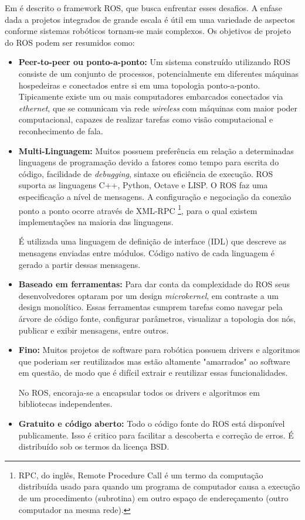 Em \citep{quigley2009ros} é descrito o framework ROS, que busca enfrentar esses desafios. A enfase dada a projetos integrados de grande escala é útil em uma variedade de aspectos conforme sistemas robóticos tornam-se mais complexos. Os objetivos de projeto do ROS podem ser resumidos como: 
\begin{itemize}
\item \textbf{Peer-to-peer ou ponto-a-ponto:} Um sistema construído utilizando ROS consiste de um conjunto de processos, potencialmente em diferentes máquinas hospedeiras e conectados entre si em uma topologia ponto-a-ponto. Tipicamente existe um ou mais computadores embarcados conectados via \textit{ethernet}, que se comunicam via rede \textit{wireless} com máquinas com maior poder computacional, capazes de realizar tarefas como visão computacional e reconhecimento de fala. 

\item \textbf{Multi-Linguagem:} Muitos possuem preferência em relação a determinadas linguagens de programação devido a fatores como tempo para escrita do código, facilidade de \textit{debugging}, sintaxe ou eficiência de execução. ROS suporta as linguagens C++, Python, Octave e LISP. O ROS faz uma especificação a nível de mensagens. A configuração e negociação da conexão ponto a ponto ocorre através de XML-RPC \footnote{RPC, do inglês, Remote Procedure Call é um termo da computação distribuída usado para quando um programa de computador causa a execução de um procedimento (subrotina) em outro espaço de endereçamento (outro computador na mesma rede).}, para o qual existem implementações na maioria das linguagens.   

É utilizada uma linguagem de definição de interface (IDL) que descreve as mensagens enviadas entre módulos. Código nativo de cada linguagem é gerado a partir dessas mensagens. 


\item \textbf{Baseado em ferramentas:} Para dar conta da complexidade do ROS seus desenvolvedores optaram por um design \textit{microkernel}, em contraste a um design monolítico. Essas ferramentas cumprem tarefas como navegar pela árvore de código fonte, configurar parâmetros, visualizar a topologia dos nós, publicar e exibir mensagens, entre outros.

\item \textbf{Fino:} Muitos projetos de software para robótica possuem drivers e algoritmos que poderiam ser reutilizados mas estão altamente "amarrados" ao software em questão, de modo que é difícil extrair e reutilizar essas funcionalidades.

No ROS, encoraja-se a encapsular todos os drivers e algoritmos em bibliotecas independentes. 


\item \textbf{Gratuito e código aberto:} Todo o código fonte do ROS está disponível publicamente. Isso é critico para facilitar a descoberta e correção de erros. É distribuído sob os termos da licença BSD.  

\end{itemize}

